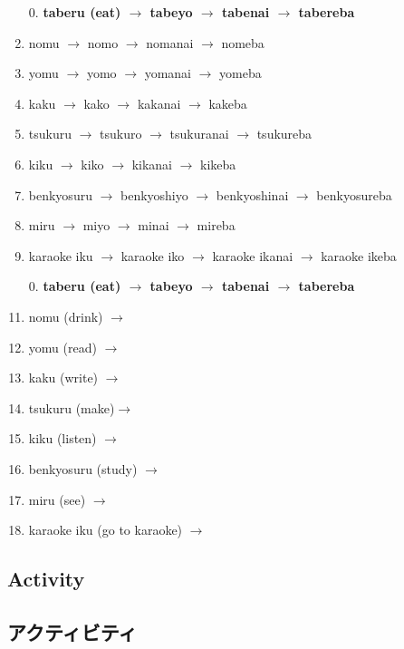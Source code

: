 \documentclass[uplatex,dvipdfmx,b5paper,english,10pt]{jsbook}
\begin{document}
\begin{toianswer}
\begin{enumerate}
\ifEnglish
 \item[0.] {\bfseries taberu (eat) $\rightarrow$ tabeyo $\rightarrow$ tabenai $\rightarrow$ tabereba}
 \item nomu        $\rightarrow$ nomo $\rightarrow$ nomanai $\rightarrow$ nomeba
 \item yomu        $\rightarrow$ yomo $\rightarrow$ yomanai $\rightarrow$ yomeba
 \item kaku        $\rightarrow$ kako $\rightarrow$ kakanai $\rightarrow$ kakeba
 \item tsukuru     $\rightarrow$ tsukuro $\rightarrow$ tsukuranai $\rightarrow$ tsukureba
 \item kiku        $\rightarrow$ kiko $\rightarrow$ kikanai $\rightarrow$ kikeba
 \item benkyosuru  $\rightarrow$ benkyoshiyo $\rightarrow$ benkyoshinai $\rightarrow$ benkyosureba
 \item miru        $\rightarrow$ miyo $\rightarrow$ minai $\rightarrow$ mireba
 \item karaoke iku $\rightarrow$ karaoke iko $\rightarrow$ karaoke ikanai $\rightarrow$ karaoke ikeba
\else
 \item[0.] {\bfseries taberu (eat) $\rightarrow$ tabeyo $\rightarrow$ tabenai $\rightarrow$ tabereba}
 \item nomu (drink)  $\rightarrow$
 \item yomu (read)   $\rightarrow$
 \item kaku (write)  $\rightarrow$
 \item tsukuru (make)$\rightarrow$
 \item kiku (listen) $\rightarrow$
 \item benkyosuru (study) $\rightarrow$
 \item miru (see)    $\rightarrow$
 \item karaoke iku (go to karaoke) $\rightarrow$
\fi
\end{enumerate}
\end{toianswer}



\ifEnglish
\subsection{Activity}
\else
\subsection{アクティビティ}
\fi
\end{document}
